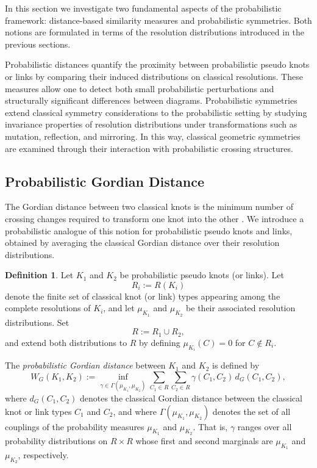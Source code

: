 \documentclass[a4paper, reqno, 12pt]{amsart}
\theoremstyle{plain}
\theoremstyle{definition}
\newtheorem{definition}[theorem]{Definition}
\begin{document}
In this section we investigate two fundamental aspects of the probabilistic framework: distance-based similarity measures and probabilistic symmetries. Both notions are formulated in terms of the resolution distributions introduced in the previous sections.

Probabilistic distances quantify the proximity between probabilistic pseudo knots or links by comparing their induced distributions on classical resolutions. These measures allow one to detect both small probabilistic perturbations and structurally significant differences between diagrams. Probabilistic symmetries extend classical symmetry considerations to the probabilistic setting by studying invariance properties of resolution distributions under transformations such as mutation, reflection, and mirroring. In this way, classical geometric symmetries are examined through their interaction with probabilistic crossing structures.




\subsection{Probabilistic Gordian Distance}

The Gordian distance between two classical knots is the minimum number of crossing changes required to transform one knot into the other \cite{Mu}. We introduce a probabilistic analogue of this notion for probabilistic pseudo knots and links, obtained by averaging the classical Gordian distance over their resolution distributions.


\begin{definition}
Let $K_1$ and $K_2$ be probabilistic pseudo knots (or links). Let
\[
R_i := R(K_i)
\]
denote the finite set of classical knot (or link) types appearing among the complete resolutions of $K_i$, and let
$\mu_{K_1}$ and $\mu_{K_2}$ be their associated resolution distributions. Set
\[
R := R_1 \cup R_2,
\]
and extend both distributions to $R$ by defining $\mu_{K_i}(C)=0$ for $C\notin R_i$.

The \emph{probabilistic Gordian distance} between \(K_1\) and \(K_2\) is defined by
\[
W_G(K_1,K_2)
:=
\inf_{\gamma\in\Gamma(\mu_{K_1},\mu_{K_2})}
\sum_{C_1\in R}\sum_{C_2\in R}
\gamma(C_1,C_2)\,
d_G(C_1,C_2),
\]
where \(d_G(C_1,C_2)\) denotes the classical Gordian distance between the classical knot or link types \(C_1\) and \(C_2\), and where \(\Gamma(\mu_{K_1},\mu_{K_2})\) denotes the set of all couplings of the probability measures \(\mu_{K_1}\) and \(\mu_{K_2}\). That is, \(\gamma\) ranges over all probability distributions on \(R\times R\) whose first and second marginals are \(\mu_{K_1}\) and \(\mu_{K_2}\), respectively.
\end{definition}
\end{document}

